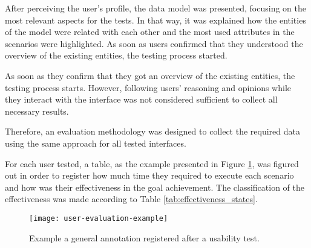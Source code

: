 After perceiving the user's profile, the data model was presented, focusing on the most relevant aspects for the tests. In that way, it was explained how the entities of the model were related with each other and the most used attributes in the scenarios were highlighted. As soon as users confirmed that they understood the overview of the existing entities, the testing process started. 

As soon as they confirm that they got an overview of the existing entities, the testing process starts. However, following users' reasoning and opinions while they interact with the interface was not considered sufficient to collect all necessary results.

Therefore, an evaluation methodology was designed to collect the required data using the same approach for all tested interfaces.

For each user tested, a table, as the example presented in Figure \ref{fig:userEvaluationExample}, was figured out in order to register how much time they required to execute each scenario and how was their effectiveness in the goal achievement. The classification of the effectiveness was made according to Table \ref{tab:effectiveness_states}.

\begin{figure}[htbp]
	\centering
	\texttt{[image: user-evaluation-example]}
	\caption{Example a general annotation registered after a usability test.}
	\label{fig:userEvaluationExample}
\end{figure}

